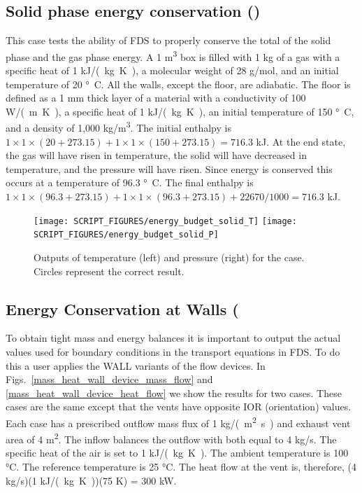 \documentclass[11pt]{book}
\begin{document}
\subsection{Solid phase energy conservation (\texorpdfstring{}{energy\_budget\_solid})}
\label{energy_budget_solid}

This case tests the ability of FDS to properly conserve the total of the solid phase and the gas phase energy.  A 1 \si{m^3} box is filled with 1 kg of a gas with a specific heat of 1 \si{kJ/(kg.K)}, a molecular weight of 28 g/mol, and an initial temperature of 20 \si{\degree C}.  All the walls, except the floor, are adiabatic.  The floor is defined as a 1 mm thick layer of a material with a conductivity of 100 \si{W/(m.K)},  a specific heat of 1 \si{kJ/(kg.K)}, an initial temperature of 150 \si{\degree C}, and a density of 1,000 \si{kg/m^3}.  The initial enthalpy is $1 \times 1 \times (20+273.15) + 1 \times 1 \times (150+273.15)  =  716.3$ kJ.  At the end state, the gas will have risen in temperature, the solid will have decreased in temperature, and the pressure will have risen.  Since energy is conserved this occurs at a temperature of 96.3 \si{\degree C}.  The final enthalpy is $1 \times 1 \times (96.3+273.15) + 1 \times 1 \times (96.3+273.15) + 22670 / 1000  =  716.3$ kJ.

\begin{figure}[ht]
\texttt{[image: SCRIPT\_FIGURES/energy\_budget\_solid\_T]}
\texttt{[image: SCRIPT\_FIGURES/energy\_budget\_solid\_P]}
\caption[The  test case]{\label{fig_solid_energy} Outputs of temperature (left) and pressure (right) for the  case.  Circles represent the correct result.}
\end{figure}


\subsection{Energy Conservation at Walls (\texorpdfstring{})}
\label{mass_heat_wall_device_test}
\label{mass_heat_wall_device_test_2}

To obtain tight mass and energy balances it is important to output the actual values used for boundary conditions in the transport equations in FDS.  To do this a user applies the WALL variants of the flow devices.  In Figs.~\ref{mass_heat_wall_device_mass_flow} and \ref{mass_heat_wall_device_heat_flow} we show the results for two cases.  These cases are the same except that the vents have opposite {\ct IOR} (orientation) values.  Each case has a prescribed outflow mass flux of 1 \si{kg/(m^2.s)} and exhaust vent area of 4 \si{m^2}.  The inflow balances the outflow with both equal to 4 \si{kg/s}.  The specific heat of the air is set to 1 \si{kJ/(kg.K)}.  The ambient temperature is 100 \si{\degreeCelsius}.  The reference temperature is 25 \si{\degreeCelsius}.  The heat flow at the vent is, therefore, (4 \si{kg/s})(1 \si{kJ/(kg.K)})(75 K) = 300 kW.
\end{document}
